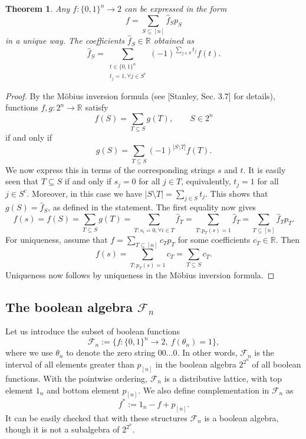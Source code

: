 \documentclass[12pt]{article}
\newtheorem{theorem}{Theorem}
\theoremstyle{definition}
\theoremstyle{remark}
\def\Fe{\mathcal F}
\begin{document}
\begin{theorem}\label{thm:basis} Any $f:\{0,1\}^n\to 2$ can be expressed  in the form 
\[
f=\sum_{S\subseteq [n]} \hat f_Sp_S
\]
in a unique way. The coefficients  $\hat f_S\in \mathbb R$ obtained as
\[
\hat f_S=\sum_{\substack{t\in \{0,1\}^n\\ t_j=1, \forall  j\in S^c}} (-1)^{\sum_{j\in
S}t_j}f(t).
\]

\end{theorem}

\begin{proof}  By the M\"obius inversion formula (see [Stanley, Sec. 3.7] for details),
functions $f, g: 2^n\to \mathbb R$ satisfy
\[
f(S)=\sum_{T\subseteq S} g(T),\qquad S\in 2^n
\]
if and only if 
\[
g(S)=\sum_{T\subseteq S}(-1)^{|S\setminus T|} f(T).
\]
We now express this in terms of the corresponding strings $s$ and $t$.
It is easily seen that $T\subseteq S$ if and only if
$s_j=0$ for all $j\in T$, equivalently, $t_j=1$ for all $j\in S^c$. Moreover,
in this case we have  $|S\setminus T|=\sum_{j\in S} t_j$. This shows that $g(S)=\hat f_S$,
as defined in the statement. The first equality now gives
\[
f(s)=f(S)=\sum_{T\subseteq S} g(T)=\sum_{T:s_i=0,\forall i\in T}\hat f_T=\sum_{T:
p_T(s)=1}\hat f_T=\sum_{T\subseteq [n]} \hat f_Tp_T.
\]
For uniqueness, assume that $f=\sum_{T\subseteq [n]} c_Tp_T$ for some coefficients $c_T\in
\mathbb R$. Then 
\[
f(s)=\sum_{T: p_T(s)=1}c_T=\sum_{T\subseteq S}c_T.
\]
Uniqueness now follows by  uniqueness in the M\"obius inversion formula.

\end{proof}






\subsection{The boolean algebra $\Fe_n$}


Let us introduce the subset of boolean functions 
\[
\Fe_n:=\{f:\{0,1\}^n\to 2,\ f(\theta_n)=1\},
\]
where we use $\theta_n$ to denote the zero string $00\dots 0$. 
In other words, $\Fe_n$ is the interval of all elements greater than $p_{[n]}$ in the boolean algebra 
$2^{2^n}$ of all boolean functions. With the pointwise ordering, $\Fe_n$ is a distributive lattice, with top element $1_n$ and 
 bottom element $p_{[n]}$. We also define complementation  in $\Fe_n$ as
\[
f^*:=1_n-f+p_{[n]}.
\]
It can be easily checked that with these structures $\Fe_n$ is a boolean algebra, though
it is not a subalgebra of $2^{2^n}$.
\end{document}
